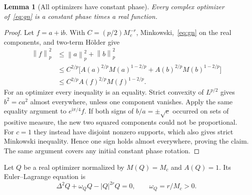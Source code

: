 \documentclass[11pt,a4paper]{article}
\newtheorem{lemma}[theorem]{Lemma}
\theoremstyle{remark}\newtheorem{remark}[theorem]{Remark}
\newcommand{\ii}{\mathrm i}\newcommand{\dd}{\,\mathrm d}
\newcommand{\norm}[1]{\left\|#1\right\|}
\begin{document}
\begin{lemma}[All optimizers have constant phase]\label{lem:phase}
Every complex optimizer of~\eqref{eq:gn} is a constant phase times a real function.
\end{lemma}
\begin{proof}
Let $f=a+\ii b$. With $C=(p/2)M_c^{-r}$, Minkowski,~\eqref{eq:gn} on the real components, and two-term H\"older give
\begin{align*}
 \norm f_p^2
 &\le\norm a_p^2+\norm b_p^2\\
 &\le C^{2/p}\bigl[A(a)^{2/p}M(a)^{1-2/p}
                 +A(b)^{2/p}M(b)^{1-2/p}\bigr]\\
 &\le C^{2/p}A(f)^{2/p}M(f)^{1-2/p}.
\end{align*}
For an optimizer every inequality is an equality. Strict convexity of $L^{p/2}$ gives $b^2=c a^2$ almost everywhere, unless one component vanishes. Apply the same equality argument to $e^{\ii\pi/4}f$. If both signs of $b/a=\pm\sqrt c$ occurred on sets of positive measure, the new two squared components could not be proportional. For $c=1$ they instead have disjoint nonzero supports, which also gives strict Minkowski inequality. Hence one sign holds almost everywhere, proving the claim. The same argument covers any initial constant phase rotation.
\end{proof}

Let $Q$ be a real optimizer normalized by $M(Q)=M_c$ and $A(Q)=1$. Its Euler--Lagrange equation is
\[
 \Delta^2Q+\omega_QQ-|Q|^{2r}Q=0,\qquad \omega_Q=r/M_c>0.
\]
\end{document}
